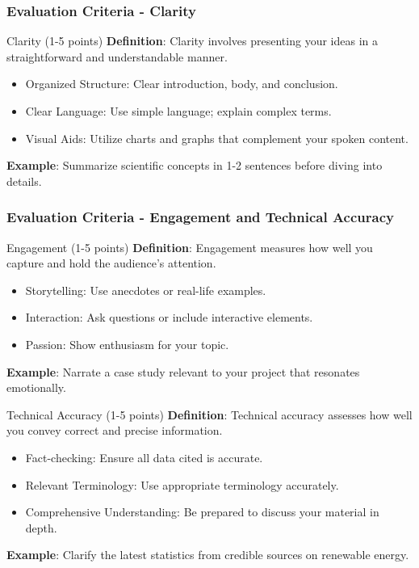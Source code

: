\documentclass[aspectratio=169]{beamer}
\begin{document}
\begin{frame}[fragile]
    \frametitle{Evaluation Criteria - Clarity}
    \begin{block}{Clarity (1-5 points)}
        \textbf{Definition}: Clarity involves presenting your ideas in a straightforward and understandable manner.
    \end{block}
    \begin{itemize}
        \item Organized Structure: Clear introduction, body, and conclusion.
        \item Clear Language: Use simple language; explain complex terms.
        \item Visual Aids: Utilize charts and graphs that complement your spoken content.
    \end{itemize}
    \textbf{Example}: Summarize scientific concepts in 1-2 sentences before diving into details.
\end{frame}

\begin{frame}[fragile]
    \frametitle{Evaluation Criteria - Engagement and Technical Accuracy}
    \begin{block}{Engagement (1-5 points)}
        \textbf{Definition}: Engagement measures how well you capture and hold the audience’s attention.
    \end{block}
    \begin{itemize}
        \item Storytelling: Use anecdotes or real-life examples.
        \item Interaction: Ask questions or include interactive elements.
        \item Passion: Show enthusiasm for your topic.
    \end{itemize}
    \textbf{Example}: Narrate a case study relevant to your project that resonates emotionally.

    \begin{block}{Technical Accuracy (1-5 points)}
        \textbf{Definition}: Technical accuracy assesses how well you convey correct and precise information.
    \end{block}
    \begin{itemize}
        \item Fact-checking: Ensure all data cited is accurate.
        \item Relevant Terminology: Use appropriate terminology accurately.
        \item Comprehensive Understanding: Be prepared to discuss your material in depth.
    \end{itemize}
    \textbf{Example}: Clarify the latest statistics from credible sources on renewable energy.
\end{frame}
\end{document}
